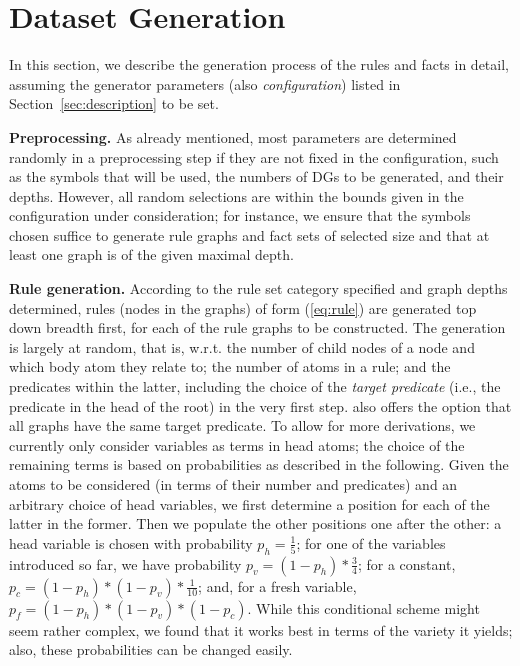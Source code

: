 \documentclass[letterpaper]{article} \usepackage{aaai20}  \usepackage{times}  \usepackage{helvet} \usepackage{courier}  \usepackage[hyphens]{url}  \usepackage{graphicx} \urlstyle{rm} \def\UrlFont{\rm}  \usepackage{graphicx}  \frenchspacing  \setlength{\pdfpagewidth}{8.5in}  \setlength{\pdfpageheight}{11in}  \usepackage{amsthm}
\theoremstyle{definition}
\newcommand{\tool}{\text{RuDaS}\xspace}
\begin{document}
\section{Dataset Generation}\label{sec:generation}

In this section, we describe the generation process of the rules and facts in detail, assuming the generator parameters (also \emph{configuration}) listed in Section~\ref{sec:description} to be set.



\textbf{Preprocessing.}
As already mentioned, most parameters are determined randomly in a preprocessing step if they are not fixed in the configuration, such as the symbols that will be used, the numbers of DGs to be generated, and their depths.
However, all random selections are within the bounds given in the configuration under consideration; for instance,
we ensure that the symbols chosen suffice to generate rule graphs and fact sets of selected size and that at least one graph is of the given maximal depth.

\textbf{Rule generation.}
According to the rule set category specified and graph depths determined, rules (nodes in the graphs) of form (\ref{eq:rule}) are generated top down breadth first, for each of the rule graphs to be constructed. 
The generation is largely at random, that is, w.r.t.
the number of child nodes of a node and which body atom they relate to; 
the number of atoms in a rule; and the predicates within the latter, including the choice of the \emph{target predicate} (i.e., the predicate in the head of the root) in the very first step. \tool also offers the option that all graphs have the same target predicate.
To allow for more derivations, we currently only consider variables as terms in head atoms; the choice of the remaining terms is based on probabilities as described in the following. 
Given the atoms to be considered (in terms of their number and predicates) and an arbitrary choice of head variables, we first determine a position for each of the latter in the former. Then we populate the other positions one after the other: a head variable is chosen with probability $p_h=\frac{1}{5}$; for one of the variables introduced so far, we have probability $p_v=(1-p_h) * \frac{3}{4}$; for a constant, $p_c=(1-p_h) * (1-p_v) * \frac{1}{10}$; and, for a fresh variable, $p_f=(1-p_h) * (1-p_v) * (1-p_c)$. While this conditional scheme might seem rather complex, we found that it works best in terms of the variety it yields; also, these probabilities can be changed easily.
\end{document}

